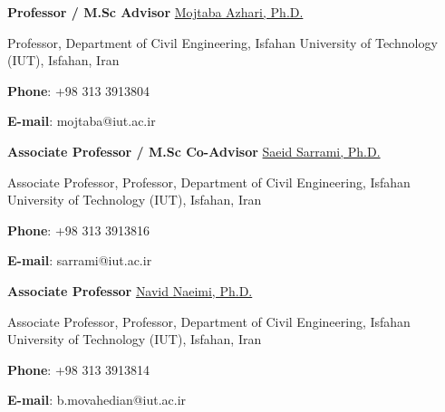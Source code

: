 

\vspace{9pt}
\begin{cventries}
  \cventry
{\textbf{Professor / M.Sc Advisor}} %
{\href{https://scholar.google.com/citations?user=ZSDFbf4AAAAJ&hl=en}{Mojtaba Azhari, Ph.D.}} %
{} %
{} %
{
	\begin{cvitems} %
		\item {Professor, Department of Civil Engineering, Isfahan University of Technology (IUT), Isfahan, Iran}
		\item {\textbf{Phone}: +98 313 3913804}
		\item {\textbf{E-mail}: mojtaba@iut.ac.ir}
	\end{cvitems}
}

\vspace{1pt}

\cventry
 {\textbf{Associate Professor / M.Sc Co-Advisor}} %
 {\href{https://scholar.google.com/citations?hl=en&user=rUy_5DEAAAAJ}{Saeid Sarrami, Ph.D.}} %
 {} %
 {} %
 {
 	\begin{cvitems} %
 		\item {Associate Professor, Professor, Department of Civil Engineering, Isfahan University of Technology (IUT), Isfahan, Iran}
 		\item {\textbf{Phone}: +98 313 3913816}
 		\item {\textbf{E-mail}: sarrami@iut.ac.ir}
 	\end{cvitems}
 }

\vspace{9pt}

\cventry
 {\textbf{Associate Professor}} %
{\href{https://scholar.google.com/citations?user=d_cAhn4AAAAJ&hl=en}{Navid Naeimi, Ph.D.}} %
{} %
{} %
{
	\begin{cvitems} %
		\item {Associate Professor, Professor, Department of Civil Engineering, Isfahan University of Technology (IUT), Isfahan, Iran}
		\item {\textbf{Phone}: +98 313 3913814}
		\item {\textbf{E-mail}: b.movahedian@iut.ac.ir}
	\end{cvitems}
}
\end{cventries}
